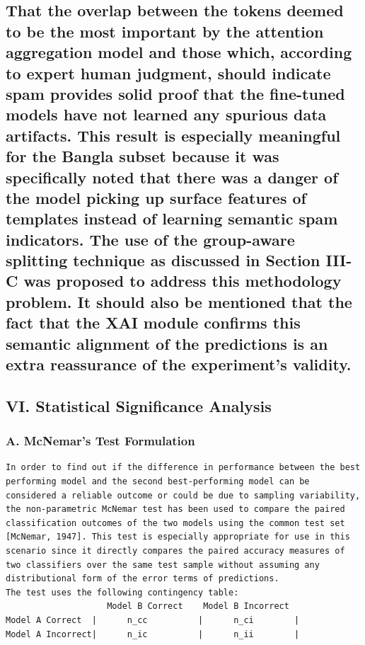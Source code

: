 \subsection{That the overlap between the tokens deemed to be the most
important by the attention aggregation model and those which, according
to expert human judgment, should indicate spam provides solid proof that
the fine-tuned models have not learned any spurious data artifacts. This
result is especially meaningful for the Bangla subset because it was
specifically noted that there was a danger of the model picking up
surface features of templates instead of learning semantic spam
indicators. The use of the group-aware splitting technique as discussed
in Section III-C was proposed to address this methodology problem. It
should also be mentioned that the fact that the XAI module confirms this
semantic alignment of the predictions is an extra reassurance of the
experiment's
validity.}\label{that-the-overlap-between-the-tokens-deemed-to-be-the-most-important-by-the-attention-aggregation-model-and-those-which-according-to-expert-human-judgment-should-indicate-spam-provides-solid-proof-that-the-fine-tuned-models-have-not-learned-any-spurious-data-artifacts.-this-result-is-especially-meaningful-for-the-bangla-subset-because-it-was-specifically-noted-that-there-was-a-danger-of-the-model-picking-up-surface-features-of-templates-instead-of-learning-semantic-spam-indicators.-the-use-of-the-group-aware-splitting-technique-as-discussed-in-section-iii-c-was-proposed-to-address-this-methodology-problem.-it-should-also-be-mentioned-that-the-fact-that-the-xai-module-confirms-this-semantic-alignment-of-the-predictions-is-an-extra-reassurance-of-the-experiments-validity.}

\subsection{VI. Statistical Significance
Analysis}\label{vi.-statistical-significance-analysis}

\subsubsection{A. McNemar's Test
Formulation}\label{a.-mcnemars-test-formulation}

\begin{verbatim}
In order to find out if the difference in performance between the best performing model and the second best-performing model can be considered a reliable outcome or could be due to sampling variability, the non-parametric McNemar test has been used to compare the paired classification outcomes of the two models using the common test set [McNemar, 1947]. This test is especially appropriate for use in this scenario since it directly compares the paired accuracy measures of two classifiers over the same test sample without assuming any distributional form of the error terms of predictions.
The test uses the following contingency table:
                    Model B Correct    Model B Incorrect
Model A Correct  |      n_cc          |      n_ci        |
Model A Incorrect|      n_ic          |      n_ii        |
\end{verbatim}

